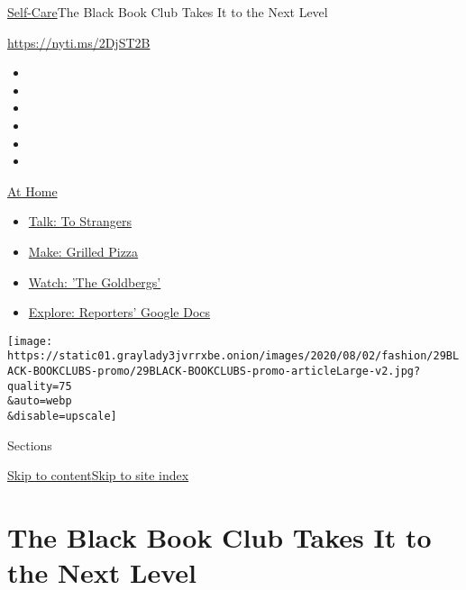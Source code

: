 \href{/section/style/self-care/}{Self-Care}\textbar{}The Black Book Club
Takes It to the Next Level

\href{https://nyti.ms/2DjST2B}{https://nyti.ms/2DjST2B}

\begin{itemize}
\item
\item
\item
\item
\item
\item
\end{itemize}

\href{https://www.nytimes3xbfgragh.onion/spotlight/at-home?action=click\&pgtype=Article\&state=default\&region=TOP_BANNER\&context=at_home_menu}{At
Home}

\begin{itemize}
\tightlist
\item
  \href{https://www.nytimes3xbfgragh.onion/2020/08/03/well/family/the-benefits-of-talking-to-strangers.html?action=click\&pgtype=Article\&state=default\&region=TOP_BANNER\&context=at_home_menu}{Talk:
  To Strangers}
\item
  \href{https://www.nytimes3xbfgragh.onion/2020/08/01/at-home/coronavirus-make-pizza-on-a-grill.html?action=click\&pgtype=Article\&state=default\&region=TOP_BANNER\&context=at_home_menu}{Make:
  Grilled Pizza}
\item
  \href{https://www.nytimes3xbfgragh.onion/2020/07/31/arts/television/goldbergs-abc-stream.html?action=click\&pgtype=Article\&state=default\&region=TOP_BANNER\&context=at_home_menu}{Watch:
  'The Goldbergs'}
\item
  \href{https://www.nytimes3xbfgragh.onion/interactive/2020/at-home/even-more-reporters-editors-diaries-lists-recommendations.html?action=click\&pgtype=Article\&state=default\&region=TOP_BANNER\&context=at_home_menu}{Explore:
  Reporters' Google Docs}
\end{itemize}

\texttt{[image: https://static01.graylady3jvrrxbe.onion/images/2020/08/02/fashion/29BLACK-BOOKCLUBS-promo/29BLACK-BOOKCLUBS-promo-articleLarge-v2.jpg?quality=75\\\&auto=webp\\\&disable=upscale]}

Sections

\protect\hyperlink{site-content}{Skip to
content}\protect\hyperlink{site-index}{Skip to site index}

\hypertarget{the-black-book-club-takes-it-to-the-next-level}{%
\section{The Black Book Club Takes It to the Next
Level}\label{the-black-book-club-takes-it-to-the-next-level}}

